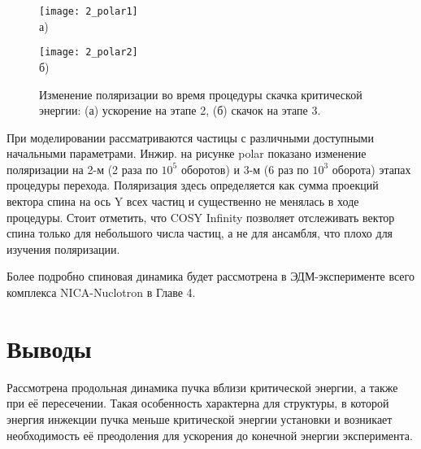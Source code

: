\begin{figure}[!h]    \label{fig:polar}
    \begin{minipage}[b][][b]{0.49\linewidth}\centering
        \texttt{[image: 2\_polar1]} \\ а)
    \end{minipage}
    \hfill
    \begin{minipage}[b][][b]{0.49\linewidth}\centering
        \texttt{[image: 2\_polar2]} \\ б)
    \end{minipage}
    \caption{Изменение поляризации во время процедуры скачка критической энергии: (а) ускорение на этапе 2, (б) скачок на этапе 3.}
\end{figure}

\par При моделировании рассматриваются частицы с различными доступными начальными параметрами. Инжир. на рисунке polar показано изменение поляризации на 2-м (2 раза по $10^5$ оборотов) и 3-м (6 раз по $10^3$ оборота) этапах процедуры перехода. Поляризация здесь определяется как сумма проекций вектора спина на ось Y всех частиц и существенно не менялась в ходе процедуры. Стоит отметить, что COSY Infinity позволяет отслеживать вектор спина только для небольшого числа частиц, а не для ансамбля, что плохо для изучения поляризации.

\par Более подробно спиновая динамика будет рассмотрена в ЭДМ-эксперименте всего комплекса NICA-Nuclotron в Главе 4.

\section*{Выводы}
\par Рассмотрена продольная динамика пучка вблизи критической энергии, а также при её пересечении. Такая особенность характерна для структуры, в которой энергия инжекции пучка меньше критической энергии установки и возникает необходимость её преодоления для ускорения до конечной энергии эксперимента.

